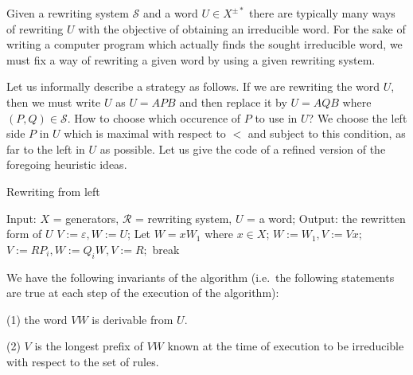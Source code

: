 \begin{ap} Given a rewriting system $\mathcal{S}$ and a word $U\in X^{\pm *}$
    there are typically many ways of rewriting $U$ with the objective of
    obtaining an irreducible word. For the sake of writing a computer program
    which actually finds the sought irreducible word, we must fix a way of
    rewriting a given word by using a given rewriting system.

    Let us informally describe a strategy as follows. If we are rewriting the
    word $U$, then we must write $U$ as $U = APB$ and then replace it by $U =
    AQB$ where $(P,Q)\in \mathcal{S}$. How to choose which occurence of $P$ to
    use in $U$? We choose the left side $P$ in $U$ which is maximal with
    respect to $<$ and subject to this condition, as far to the left in $U$ as
    possible. Let us give the code of a refined version of the foregoing
    heuristic ideas.

\begin{algorithm}
\caption{Rewriting from left}
\begin{algorithmic}[1]
    \State Input: $X$ = generators, $\mathcal{R}$ = rewriting system, $U$ = a word;
    \State Output: the rewritten form of $U$
    \State $V:= \varepsilon, W := U$;
    \State Let $W = xW_1$ where $x\in X$; $W:= W_1, V:= Vx;$
    \State $V:= RP_i, W := Q_i W, V:= R;$
    \State break
    \EndIf
    \EndFor
    \EndWhile
    \EndProcedure
\end{algorithmic}
\end{algorithm}

We have the following invariants of the algorithm (i.e.~the following
statements are true at each step of the execution of the algorithm):

(1) the word $VW$ is derivable from $U$.

(2) $V$ is the longest prefix of $VW$ known at the time of execution to be
irreducible with respect to the set of rules.

\end{ap}

